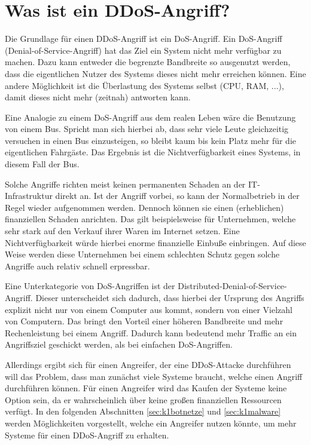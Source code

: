 \chapter{Was ist ein DDoS-Angriff?}
\label{chap:kapitel1}

Die Grundlage für einen DDoS-Angriff ist ein DoS-Angriff. Ein DoS-Angriff (Denial-of-Service-Angriff) hat das Ziel ein System nicht mehr verfügbar zu machen. Dazu kann entweder die begrenzte Bandbreite so ausgenutzt werden, dass die eigentlichen Nutzer des Systems dieses nicht mehr erreichen können. Eine andere Möglichkeit ist die Überlastung des Systems selbst (CPU, RAM, ...), damit dieses nicht mehr (zeitnah) antworten kann.

Eine Analogie zu einem DoS-Angriff aus dem realen Leben wäre die Benutzung von einem Bus. Spricht man sich hierbei ab, dass sehr viele Leute gleichzeitig versuchen in einen Bus einzusteigen, so bleibt kaum bis kein Platz mehr für die eigentlichen Fahrgäste. Das Ergebnis ist die Nichtverfügbarkeit eines Systems, in diesem Fall der Bus.

Solche Angriffe richten meist keinen permanenten Schaden an der IT-Infrastruktur direkt an. Ist der Angriff vorbei, so kann der Normalbetrieb in der Regel wieder aufgenommen werden. Dennoch können sie einen (erheblichen) finanziellen Schaden anrichten. Das gilt beispielsweise für Unternehmen, welche sehr stark auf den Verkauf ihrer Waren im Internet setzen. Eine Nichtverfügbarkeit würde hierbei enorme finanzielle Einbuße einbringen. Auf diese Weise werden diese Unternehmen bei einem schlechten Schutz gegen solche Angriffe auch relativ schnell erpressbar.

Eine Unterkategorie von DoS-Angriffen ist der Distributed-Denial-of-Service-Angriff. Dieser unterscheidet sich dadurch, dass hierbei der Ursprung des Angriffs explizit nicht nur von einem Computer aus kommt, sondern von einer Vielzahl von Computern. Das bringt den Vorteil einer höheren Bandbreite und mehr Rechenleistung bei einem Angriff. Dadurch kann bedeutend mehr Traffic an ein Angriffsziel geschickt werden, als bei einfachen DoS-Angriffen.

Allerdings ergibt sich für einen Angreifer, der eine DDoS-Attacke durchführen will das Problem, dass man zunächst viele Systeme braucht, welche einen Angriff durchführen können. Für einen Angreifer wird das Kaufen der Systeme keine Option sein, da er wahrscheinlich über keine großen finanziellen Ressourcen verfügt. In den folgenden Abschnitten \ref{sec:k1botnetze} und \ref{sec:k1malware} werden Möglichkeiten vorgestellt, welche ein Angreifer nutzen könnte, um mehr Systeme für einen DDoS-Angriff zu erhalten.

